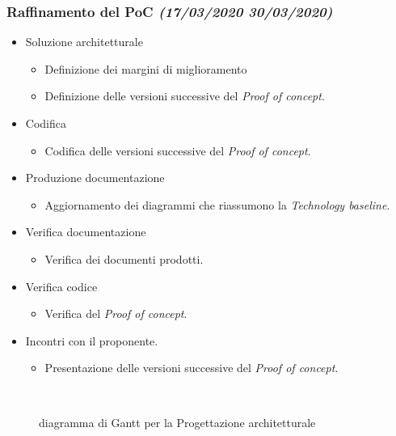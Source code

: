 \documentclass[../piano-di-progetto.tex]{subfiles}
\begin{document}
\subsubsection[Raffinamento del PoC]{Raffinamento del PoC {\normalsize\normalfont\itshape(17/03/2020  30/03/2020)}}%
\label{subs:raffinamento_del_poc}
\begin{itemize}
  \item Soluzione architetturale
  \begin{itemize}
    \item Definizione dei margini di miglioramento
    \item Definizione delle versioni successive del \textit{Proof of concept}.
  \end{itemize}
  \item Codifica
  \begin{itemize}
    \item Codifica delle versioni successive del \textit{Proof of concept}.
  \end{itemize}
  \item Produzione documentazione
  \begin{itemize}
    \item Aggiornamento dei diagrammi che riassumono la \textit{Technology baseline}.
  \end{itemize}
  \item Verifica documentazione
  \begin{itemize}
    \item Verifica dei documenti prodotti.
  \end{itemize}
  \item Verifica codice
  \begin{itemize}
    \item Verifica del \textit{Proof of concept}.
  \end{itemize}
  \item Incontri con il proponente.
  \begin{itemize}
    \item Presentazione delle versioni successive del \textit{Proof of concept}.
  \end{itemize}
\end{itemize}
\begin{figure}[H]
  \centering
  
  \caption{diagramma di Gantt per la Progettazione architetturale}%
~~\label{fig:gantt_progettazione_architetturale}
\end{figure}
\end{document}
